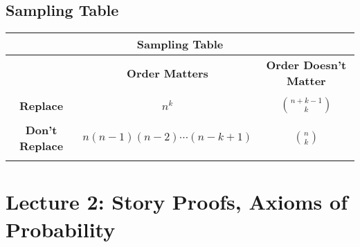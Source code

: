 \documentclass[11pt, oneside]{article}   	%
\begin{document}
	\subsection{Sampling Table}
	\begin{center}
		\begin{tabular}{ |c|c|c| }
	 	\hline
		\multicolumn{3}{|c|}{ \textbf{Sampling Table} } \\
 		\hline
 		&\textbf{Order Matters}	&\textbf{Order Doesn't Matter} \\
 		\hline
 		&&\\
		\textbf{Replace}	&$n^k$ 	&$\binom{n+k-1}{k}$\\
		&&\\
		\textbf{Don't Replace} 	&$n(n-1)(n-2) \cdots (n-k+1)$ 	& $\binom{n}{k}$\\
		&&\\
 		\hline
		\end{tabular}
	\end{center}
	
\break
\section{Lecture 2: Story Proofs, Axioms of Probability}
\end{document}

